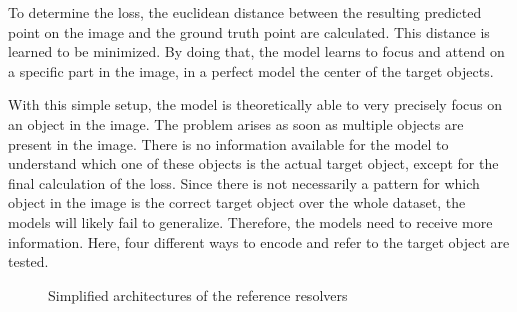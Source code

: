 To determine the loss, the euclidean distance between the resulting predicted point on the image and the ground truth point are calculated.
This distance is learned to be minimized.
By doing that, the model learns to focus and attend on a specific part in the image, in a perfect model the center of the target objects.

With this simple setup, the model is theoretically able to very precisely focus on an object in the image.
The problem arises as soon as multiple objects are present in the image.
There is no information available for the model to understand which one of these objects is the actual target object, except for the final calculation of the loss.
Since there is not necessarily a pattern for which object in the image is the correct target object over the whole dataset, the models will likely fail to generalize.
Therefore, the models need to receive more information.
Here, four different ways to encode and refer to the target object are tested.

\begin{figure}[ht]
    \centering
    \caption{Simplified architectures of the reference resolvers}
\end{figure}

